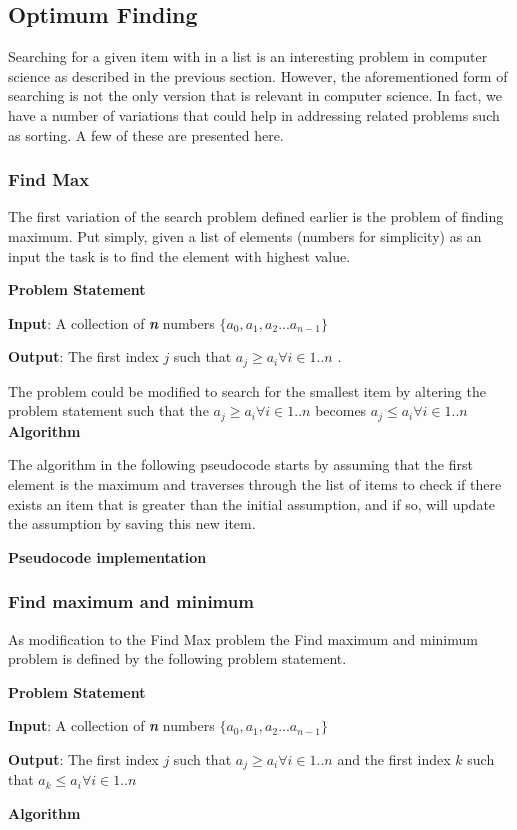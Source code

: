\documentclass[12pt,a4paper]{book}
\begin{document}
\subsection{Optimum Finding}
Searching for a given item with in a list is an interesting problem in computer science as described in the previous section. However, the aforementioned form of searching is not the only version that is relevant in computer science. In fact, we have a number of variations that could help in addressing related problems such as sorting. A few of these are presented here.
\subsubsection{Find Max}
The first variation of the search problem defined earlier is the problem of finding maximum. Put simply, given a list of elements (numbers for simplicity) as an input the task is to find the element with highest value.\par
\noindent \textbf {Problem Statement} \par
\textbf{Input}: A collection of \textbf{\textit{n}} numbers $\{a_{0} , a_{1} , a_{2} ... a_{n-1} \}$\par
\textbf{Output}: The first index $j$ such that  $a_{j} \geq a_{i}  \forall i \in {1..n}$ . \par
\noindent The problem could be modified to search for the smallest item by altering the problem statement such that the  $a_{j} \geq a_{i}  \forall i \in {1..n}$ becomes  $a_{j} \leq a_{i}  \forall i \in {1..n}$ 
\noindent \textbf {Algorithm} \par
\noindent The algorithm in the following pseudocode starts by assuming that the first element is the maximum and traverses through the list of items to check if there exists an item that is greater than the initial assumption, and if so, will update the assumption by saving this new item. \par
\noindent \textbf {Pseudocode implementation}

\subsubsection{Find maximum and minimum}
As modification to the Find Max problem the Find maximum and minimum problem is defined by the following problem statement.\par
\noindent \textbf {Problem Statement} \par
\textbf{Input}: A collection of \textbf{\textit{n}} numbers $\{a_{0} , a_{1} , a_{2} ... a_{n-1} \}$\par
\textbf{Output}: The first index $j$ such that  $a_{j} \geq a_{i}  \forall i \in {1..n}$  and the first index $k$ such that  $a_{k} \leq a_{i}  \forall i \in {1..n}$ \par
\noindent \textbf {Algorithm} \par
\end{document}
